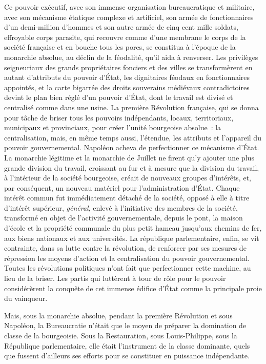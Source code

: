\documentclass[french,twoside]{book} %
\begin{document}
Ce pouvoir exécutif, avec son immense organisation bureaucratique et militaire, avec son mécanisme étatique complexe et artificiel, son armée de fonctionnaires d’un demi-million d’hommes et son autre armée de cinq cent mille soldats, effroyable corps parasite, qui recouvre comme d’une membrane le corps de la société française et en bouche tous les pores, se constitua à l’époque de la monarchie absolue, au déclin de la féodalité, qu’il aida à renverser. Les privilèges seigneuriaux des grands propriétaires fonciers et des villes se transformèrent en autant d’attributs du pouvoir d’État, les dignitaires féodaux en fonctionnaires appointés, et la carte bigarrée des droits souverains médiévaux contradictoires devint le plan bien réglé d’un pouvoir d’État, dont le travail est divisé et centralisé comme dans une usine. La première Révolution française, qui se donna pour tâche de briser tous les pouvoirs indépendants, locaux, territoriaux, municipaux et provinciaux, pour créer l’unité bourgeoise absolue : la centralisation, mais, en même temps aussi, l’étendue, les attributs et l’appareil du pouvoir gouvernemental. Napoléon acheva de perfectionner ce mécanisme d’État. La monarchie légitime et la monarchie de Juillet ne firent qu’y ajouter une plus grande division du travail, croissant au fur et à mesure que la division du travail, à l’intérieur de la société bourgeoise, créait de nouveaux groupes d’intérêts, et, par conséquent, un nouveau matériel pour l’administration d’État. Chaque intérêt commun fut immédiatement détaché de la société, opposé à elle à titre d’intérêt supérieur, \emph{général}, enlevé à l’initiative des membres de la société, transformé en objet de l’activité gouvernementale, depuis le pont, la maison d’école et la propriété communale du plus petit hameau jusqu’aux chemins de fer, aux biens nationaux et aux universités. La république parlementaire, enfin, se vit contrainte, dans sa lutte contre la révolution, de renforcer par ses mesures de répression les moyens d’action et la centralisation du pouvoir gouvernemental. Toutes les révolutions politiques n’ont fait que perfectionner cette machine, au lieu de la briser. Les partis qui luttèrent à tour de rôle pour le pouvoir considérèrent la conquête de cet immense édifice d’État comme la principale proie du vainqueur.\par
Mais, sous la monarchie absolue, pendant la première Révolution et sous Napoléon, la Bureaucratie n’était que le moyen de préparer la domination de classe de la bourgeoisie. Sous la Restauration, sous Louis-Philippe, sous la République parlementaire, elle était l’instrument de la classe dominante, quels que fussent d’ailleurs ses efforts pour se constituer en puissance indépendante.\par
\end{document}
